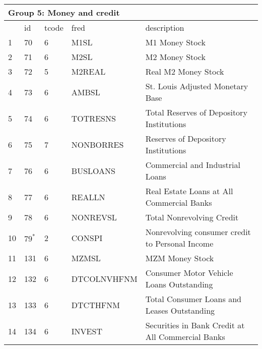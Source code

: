 \begin{table}[ht] 
\centering 
\begin{tabular}{lllll}
\multicolumn{5}{l}{Group 5: Money and credit} \\
\toprule
 & id & tcode & fred & description \\
\midrule
1 & 70 & 6 & M1SL & M1 Money Stock \\
2 & 71 & 6 & M2SL & M2 Money Stock \\
3 & 72 & 5 & M2REAL & Real M2 Money Stock \\
4 & 73 & 6 & AMBSL & St. Louis Adjusted Monetary Base \\
5 & 74 & 6 & TOTRESNS & Total Reserves of Depository Institutions \\
6 & 75 & 7 & NONBORRES & Reserves of Depository Institutions \\
7 & 76 & 6 & BUSLOANS & Commercial and Industrial Loans \\
8 & 77 & 6 & REALLN & Real Estate Loans at All Commercial Banks \\
9 & 78 & 6 & NONREVSL & Total Nonrevolving Credit \\
10 & $79^*$ & 2 & CONSPI & Nonrevolving consumer credit to Personal Income \\
11 & 131 & 6 & MZMSL & MZM Money Stock \\
12 & 132 & 6 & DTCOLNVHFNM & Consumer Motor Vehicle Loans Outstanding \\
13 & 133 & 6 & DTCTHFNM & Total Consumer Loans and Leases Outstanding \\
14 & 134 & 6 & INVEST & Securities in Bank Credit at All Commercial Banks \\
\bottomrule
\end{tabular}  
\end{table} 